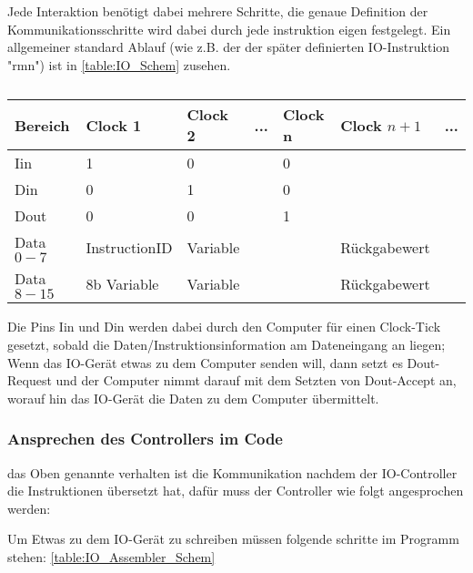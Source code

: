 \documentclass{scrartcl}
\begin{document}
Jede Interaktion benötigt dabei mehrere Schritte, die genaue Definition der Kommunikationsschritte wird dabei durch jede instruktion eigen festgelegt.
Ein allgemeiner standard Ablauf (wie z.B. der der später definierten IO-Instruktion "rmn") ist in \autoref{table:IO_Schem} zusehen.

\begin{center}
	\begin{table}[h]
		\caption{\label{table:IO_Schem}}
		\begin{tabular}{l | l | l | l | l | l | l}
			 Bereich & Clock 1 & Clock 2 & ... & Clock n & Clock $n+1$ & ... \\
			\hline
			Iin & 1 & 0 &   & 0 & \\
			Din & 0 & 1 &   & 0 & \\
			Dout & 0 & 0 &   & 1 & \\
			Data$0-7$ & InstructionID & Variable &   &   & Rückgabewert \\
			Data$8-15$ & 8b Variable & Variable &   &   & Rückgabewert
 		\end{tabular}
	\end{table}
\end{center}

Die Pins Iin und Din werden dabei durch den Computer für einen Clock-Tick gesetzt, sobald die Daten/Instruktionsinformation am Dateneingang an liegen;
Wenn das IO-Gerät etwas zu dem Computer senden will, dann setzt es Dout-Request und der Computer nimmt darauf mit dem Setzten von Dout-Accept an, worauf hin das IO-Gerät die Daten zu dem Computer übermittelt.

\subsubsection{\label{section:IO-Instructions}Ansprechen des Controllers im Code}
das Oben genannte verhalten ist die Kommunikation nachdem der IO-Controller die Instruktionen übersetzt hat, dafür muss der Controller wie folgt angesprochen werden:

Um Etwas zu dem IO-Gerät zu schreiben müssen folgende schritte im Programm stehen: \autoref{table:IO_Assembler_Schem}
\end{document}
